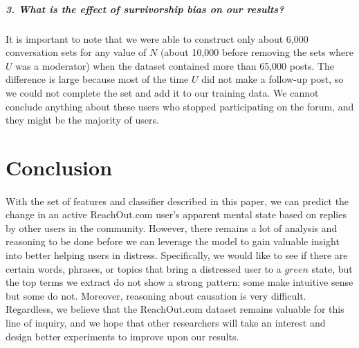 \documentclass{article}
\begin{document}
\subparagraph{3. What is the effect of survivorship bias on our results?}It is important to note that we were able to construct only about 6,000 conversation sets for any value of $N$ (about 10,000 before removing the sets where $U$ was a moderator) when the dataset contained more than 65,000 posts. The difference is large because most of the time $U$ did not make a follow-up post, so we could not complete the set and add it to our training data. We cannot conclude anything about these users who stopped participating on the forum, and they might be the majority of users.

\section{Conclusion}

\paragraph{}With the set of features and classifier described in this paper, we can predict the change in an active ReachOut.com user's apparent mental state based on replies by other users in the community. However, there remains a lot of analysis and reasoning to be done before we can leverage the model to gain valuable insight into better helping users in distress. Specifically, we would like to see if there are certain words, phrases, or topics that bring a distressed user to a $green$ state, but the top terms we extract do not show a strong pattern; some make intuitive sense but some do not. Moreover, reasoning about causation is very difficult. Regardless, we believe that the ReachOut.com dataset remains valuable for this line of inquiry, and we hope that other researchers will take an interest and design better experiments to improve upon our results.
\end{document}
